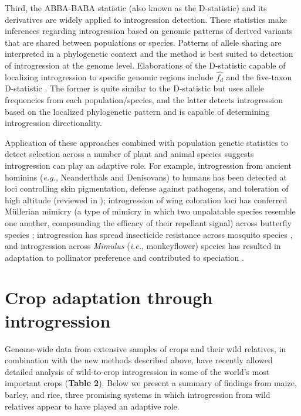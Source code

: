 \documentclass[11pt]{article}
\newcommand{\gmj}[1]{\textcolor{blue}{ \emph{\scriptsize  #1}} } %
\begin{document}
Third, the ABBA-BABA statistic (also known as the D-statistic) and its derivatives are widely applied to introgression detection.
These statistics make inferences regarding introgression based on genomic patterns of derived variants that are shared between populations or species.
Patterns of allele sharing are interpreted in a phylogenetic context and the method is best suited to detection of introgression at the genome level.
Elaborations of the D-statistic capable of localizing introgression to specific genomic regions include $\hat{f_{d}}$ \cite{Martin2015} and the five-taxon D-statistic \cite{pease2015}.
The former is quite similar to the D-statistic but uses allele frequencies from each population/species, and the latter detects introgression based on the localized phylogenetic pattern and is capable of determining introgression directionality.

Application of these approaches combined with population genetic statistics to detect selection across a number of plant and animal species suggests introgression can play an adaptive role.
For example, introgression from ancient hominins (\emph{e.g.}, Neanderthals and Denisovans) to humans has been detected at loci controlling skin pigmentation, defense against pathogens, and toleration of high altitude (reviewed in \cite{Racimo2015});
introgression of wing coloration loci has conferred M\"{u}llerian mimicry
(a type of mimicry in which two unpalatable species resemble one another, compounding the efficacy of their repellant signal)
across butterfly species \cite{Heliconius2012}; introgression has spread insecticide resistance across mosquito species \cite{Norris2015}, and introgression across \emph{Mimulus} (\emph{i.e.}, monkeyflower) species has resulted in adaptation to pollinator preference and contributed to speciation \cite{Stankowski2015}.






\section*{Crop adaptation through introgression}

Genome-wide data from extensive samples of crops and their wild relatives, in combination with the new methods described above, have recently allowed detailed analysis of wild-to-crop introgression in some of the world's most important crops (\textbf{Table 2}).
Below we present a summary of findings from maize, barley, and rice, three promising systems in which introgression from wild relatives appear to have played an adaptive role.
\end{document}
